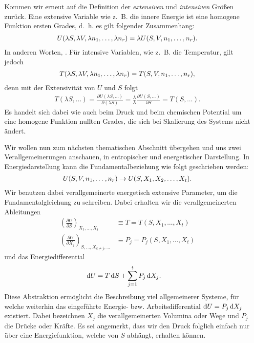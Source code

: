 Kommen wir erneut auf die Definition der \emph{extensiven} und \emph{intensiven} Größen zurück. Eine extensive Variable wie z.~B. die innere Energie ist eine homogene Funktion ersten Grades, d.~h. es gilt folgender Zusammenhang:
\begin{align*}
    U(\lambda S,\lambda V,\lambda n_1,\ldots,\lambda n_r) = \lambda U(S,V,n_1,\ldots,n_r).
\end{align*}
In anderen Worten, .
Für intensive Variablen, wie z.~B. die Temperatur, gilt jedoch
\begin{align*}
    T(\lambda S,\lambda V,\lambda n_1,\ldots,\lambda n_r)=T(S,V,n_1,\ldots,n_r),
\end{align*}
denn mit der Extensivität von $U$ und $S$ folgt
\begin{align*}
    T(\lambda S,\ldots) = \frac{\partial U(\lambda S,\ldots)}{\partial(\lambda S)}=\frac{\lambda}{\lambda}\frac{\partial U(S,\ldots)}{\partial S}=T(S,\ldots).
\end{align*}
Es handelt sich dabei wie auch beim Druck und beim chemischen Potential um eine homogene Funktion nullten Grades, die sich bei Skalierung des Systems nicht ändert.

Wir wollen nun zum nächsten thematischen Abschnitt übergehen und uns zwei Verallgemeinerungen anschauen, in entropischer und energetischer Darstellung.
In Energiedarstellung kann die Fundamentalbeziehung wie folgt geschrieben werden:
\begin{align*}
    U(S,V,n_1,\ldots,n_r) \rightarrow U(S,X_1,X_2,\ldots,X_t).
\end{align*}
Wir benutzen dabei verallgemeinerte energetisch extensive Parameter, um die Fundamentalgleichung zu schreiben. Dabei erhalten wir die verallgemeinerten Ableitungen
\begin{align*}
    \left(\frac{\partial U}{\partial S}\right)_{X_1,\ldots,X_t}                & \equiv T = T(S,X_1,\ldots,X_t)     \\
    \left(\frac{\partial U}{\partial X_j}\right)_{S,\ldots,X_{k\neq j},\ldots} & \equiv P_j = P_j(S,X_1,\ldots,X_t) 
\end{align*}
und das Energiedifferential
\begin{align}
    \label{eq:energetische_fundamentalgleichung}
    \mathop{}\!\mathrm{d} U & = T\mathop{}\!\mathrm{d} S + \sum_{j=1}^tP_j\mathop{}\!\mathrm{d} X_j.
\end{align}
Diese Abstraktion ermöglicht die Beschreibung viel allgemeinerer Systeme, für welche weiterhin das eingeführte Energie- bzw. Arbeitsdifferential $\mathop{}\!\mathrm{d} U = P_j\mathop{}\!\mathrm{d} X_j$ existiert.
Dabei bezeichnen $X_j$ die verallgemeinerten Volumina oder Wege und $P_j$ die Drücke oder Kräfte.
Es sei angemerkt, dass wir den Druck folglich einfach nur über eine Energiefunktion, welche von $S$ abhängt, erhalten können.

